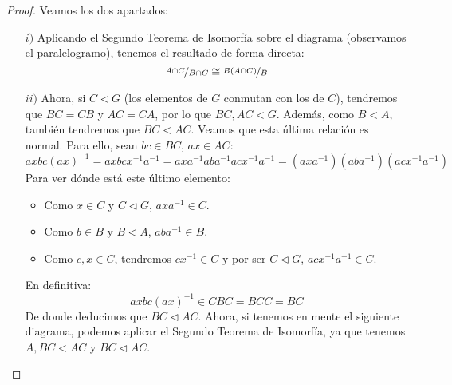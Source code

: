 \begin{lema}
    \begin{proof}
        Veamos los dos apartados:
        \begin{enumerate}
            \item[$i)$] Aplicando el Segundo Teorema de Isomorfía sobre el diagrama (observamos el paralelogramo), tenemos el resultado de forma directa:
                \begin{equation*}
                    \nicefrac{A\cap C}{B\cap C} \cong \nicefrac{B(A\cap C)}{B}
                \end{equation*}
            \item[$ii)$] Ahora, si $C\lhd G$ (los elementos de $G$ conmutan con los de $C$), tendremos que $BC = CB$ y $AC = CA$, por lo que $BC, AC < G$. Además, como $B<A$, también tendremos que $BC < AC$. Veamos que esta última relación es normal. Para ello, sean $bc\in BC$, $ax\in AC$:
                \begin{equation*}
                    axbc{(ax)}^{-1} = axbcx^{-1}a^{-1} = axa^{-1}aba^{-1}acx^{-1}a^{-1} = (axa^{-1})(aba^{-1})(acx^{-1}a^{-1})
                \end{equation*}
                Para ver dónde está este último elemento:
                \begin{itemize}
                    \item Como $x\in C$ y $C\lhd G$, $axa^{-1} \in C$.
                    \item Como $b\in B$ y $B\lhd A$, $aba^{-1}\in B$.
                    \item Como $c,x\in C$, tendremos $cx^{-1}\in C$ y por ser $C\lhd G$, $acx^{-1}a^{-1} \in C$.
                \end{itemize}
                En definitiva:
                \begin{equation*}
                    axbc{(ax)}^{-1} \in CBC = BCC = BC
                \end{equation*}
                De donde deducimos que $BC\lhd AC$. Ahora, si tenemos en mente el siguiente diagrama, podemos aplicar el Segundo Teorema de Isomorfía, ya que tenemos $A,BC< AC$ y $BC\lhd AC$.

                \begin{figure}[H]
                    \centering
\end{figure}
\end{enumerate}
\end{proof}
\end{lema}
